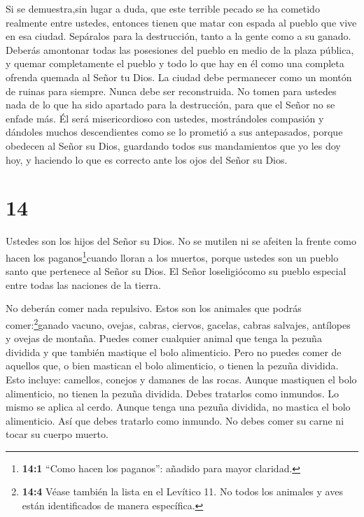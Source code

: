 Si se demuestra,sin lugar a duda, que este terrible pecado se ha
cometido realmente entre ustedes,  entonces tienen que
matar con espada al pueblo que vive en esa ciudad. Sepáralos para la
destrucción, tanto a la gente como a su ganado.  Deberás
amontonar todas las posesiones del pueblo en medio de la plaza pública,
y quemar completamente el pueblo y todo lo que hay en él como una
completa ofrenda quemada al Señor tu Dios. La ciudad debe permanecer
como un montón de ruinas para siempre. Nunca debe ser reconstruida.
 No tomen para ustedes nada de lo que ha sido apartado para
la destrucción, para que el Señor no se enfade más. Él será
misericordioso con ustedes, mostrándoles compasión y dándoles muchos
descendientes como se lo prometió a sus antepasados, 
porque obedecen al Señor su Dios, guardando todos sus mandamientos que
yo les doy hoy, y haciendo lo que es correcto ante los ojos del Señor su
Dios.

\hypertarget{section-13}{%
\section{14}\label{section-13}}

 Ustedes son los hijos del Señor su Dios. No se mutilen ni
se afeiten la frente como hacen los paganos\footnote{\textbf{14:1}
  ``Como hacen los paganos'': añadido para mayor claridad.}cuando lloran
a los muertos,  porque ustedes son un pueblo santo que
pertenece al Señor su Dios. El Señor loseligiócomo su pueblo especial
entre todas las naciones de la tierra.

 No deberán comer nada repulsivo.  Estos son los
animales que podrás comer:\footnote{\textbf{14:4} Véase también la lista
  en el Levítico 11. No todos los animales y aves están identificados de
  manera específica.}ganado vacuno, ovejas, cabras, 
ciervos, gacelas, cabras salvajes, antílopes y ovejas de montaña.
 Puedes comer cualquier animal que tenga la pezuña dividida
y que también mastique el bolo alimenticio.  Pero no puedes
comer de aquellos que, o bien mastican el bolo alimenticio, o tienen la
pezuña dividida. Esto incluye: camellos, conejos y damanes de las rocas.
Aunque mastiquen el bolo alimenticio, no tienen la pezuña dividida.
Debes tratarlos como inmundos.  Lo mismo se aplica al cerdo.
Aunque tenga una pezuña dividida, no mastica el bolo alimenticio. Así
que debes tratarlo como inmundo. No debes comer su carne ni tocar su
cuerpo muerto.

